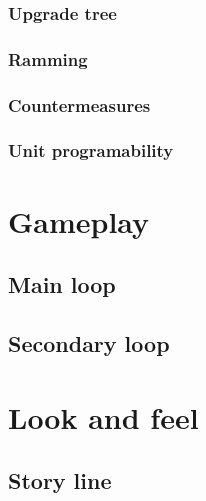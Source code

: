 \documentclass{article}[10pt]
\begin{document}
\subsubsection{Upgrade tree}
\paragraph{}

\subsubsection{Ramming}
\paragraph{}

\subsubsection{Countermeasures}
\paragraph{}

\subsubsection{Unit programability}
\paragraph{}

\section{Gameplay}
\subsection{Main loop}
\subsection{Secondary loop}
\pagebreak

\section{Look and feel}
\subsection{Story line}
\end{document}
